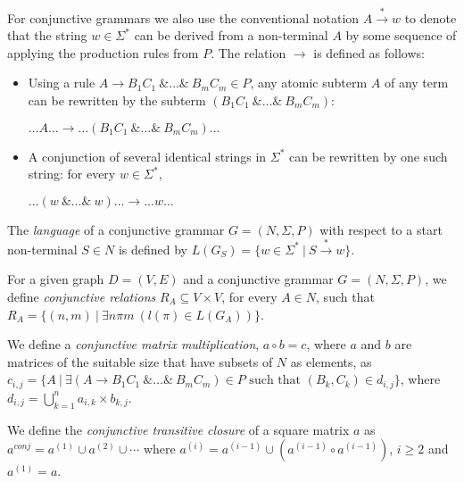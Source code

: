 For conjunctive grammars we also use the conventional notation $A \xrightarrow{*} w$ to denote that the string $w \in \Sigma^*$ can be derived from a non-terminal $A$ by some sequence of applying the production rules from $P$. The relation $\rightarrow$ is defined as follows:
\begin{itemize}
	\item Using a rule $A \rightarrow B_1 C_1~\& \ldots \&~B_m C_m \in P$, any atomic subterm $A$ of any term can be rewritten by the subterm $(B_1 C_1 ~\& \ldots \&~ B_m C_m)$:
		\begin{center}
			$\ldots A \ldots \rightarrow \ldots (B_1 C_1~\& \ldots \&~B_m C_m) \ldots$
		\end{center}
	\item A conjunction of several identical strings in $\Sigma^*$ can be rewritten by one such string: for every $w \in \Sigma^*$,
		\begin{center}
			$\ldots (w~\& \ldots \&~w) \ldots \rightarrow \ldots w \ldots$
		\end{center}
		   
\end{itemize}

The \textit{language} of a conjunctive grammar $G = (N,\Sigma,P)$ with respect to a start non-terminal $S \in N$ is defined by $L(G_S) = \{w \in \Sigma^*~|~S \xrightarrow{*} w\}$.

For a given graph $D = (V, E)$ and a conjunctive grammar $G = (N, \Sigma, P)$, we define \textit{conjunctive relations} $R_A \subseteq V \times V$, for every $A \in N$, such that $R_A = \{(n,m)~|~\exists n \pi m~(l(\pi) \in L(G_A))\}$.

We define a \textit{conjunctive matrix multiplication}, $a \circ b = c$, where $a$ and $b$ are matrices of the suitable size that have subsets of $N$ as elements, as $c_{i,j} = \{A~|~\exists (A \rightarrow B_1 C_1~\& \ldots \&~B_m C_m) \in P \text{ such that } (B_k, C_k) \in d_{i,j} \}$, where $d_{i,j} = \bigcup^{n}_{k=1}{a_{i,k} \times b_{k,j}}$. 

We define the \textit{conjunctive transitive closure} of a square matrix $a$ as $a^{conj} = a^{(1)} \cup a^{(2)} \cup \cdots$ where $a^{(i)} = a^{(i-1)} \cup (a^{(i-1)} \circ a^{(i-1)})$, $i \ge 2$ and $a^{(1)} = a$.
